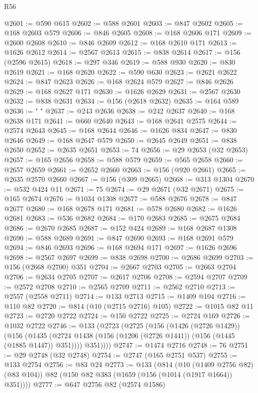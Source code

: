 \begin{lexlean}{R56}
\begin{coremodule}
@2601 := @590 @615
@2602 := @588 @2601
@2603 := @847 @2602
@2605 := @168 @2603 @579
@2606 := @846 @2605
@2608 := @168 @2606 @171
@2609 := @2600 @2608
@2610 := @846 @2609
@2612 := @168 @2610 @171
@2613 := @1626 @2612
@2614 := @2567 @2613
@2615 := @838 @2614
@2617 := @156 (@2596 @2615)
@2618 := @297 @346
@2619 := @588 @930
@2620 := @830 @2619
@2621 := @168 @2620
@2622 := @590 @630
@2623 := @2621 @2622
@2624 := @847 @2623
@2626 := @168 @2624 @579
@2627 := @846 @2626
@2629 := @168 @2627 @171
@2630 := @1626 @2629
@2631 := @2567 @2630
@2632 := @838 @2631
@2634 := @156 (@2618 @2632)
@2635 := @164 @589
@2636 := " "
@2637 := @243 @2636
@2638 := @242 @2637
@2640 := @168 @2638 @171
@2641 := @660 @2640
@2643 := @168 @2641 @2575
@2644 := @2574 @2643
@2645 := @168 @2644
@2646 := @1626 @834
@2647 := @830 @2646
@2649 := @168 @2647 @579
@2650 := @2645 @2649
@2651 := @838 @2650
@2652 := @2635 @2651
@2653 := 74
@2656 := @29 @2653 (@32 @2653)
@2657 := @165 @2656
@2658 := @588 @579
@2659 := @565 @2658
@2660 := @2657 @2659
@2661 := @2652 @2660
@2663 := @156 (@920 @2661)
@2665 := @2635 @2570 @2660
@2667 := @156 (@309 @2665)
@2668 := @313 @1304
@2670 := @532 @424 @11
@2671 := 75
@2674 := @29 @2671 (@32 @2671)
@2675 := @165 @2674
@2676 := @1034 @1308
@2677 := @588 @2676
@2678 := @847 @2677
@2680 := @168 @2678 @171
@2681 := @578 @2680
@2682 := @1626 @2681
@2683 := @536 @2682
@2684 := @170 @2683
@2685 := @2675 @2684
@2686 := @2670 @2685
@2687 := @152 @424
@2689 := @168 @2687 @1308
@2690 := @588 @2689
@2691 := @847 @2690
@2693 := @168 @2691 @579
@2694 := @846 @2693
@2696 := @168 @2694 @171
@2697 := @1626 @2696
@2698 := @2567 @2697
@2699 := @838 @2698
@2700 := @2686 @2699
@2703 := @156 (@2668 @2700) @351
@2704 := @2667 @2703
@2705 := @2663 @2704
@2706 := @2634 @2705
@2707 := @2617 @2706
@2708 := @2594 @2707
@2709 := @2572 @2708
@2710 := @2565 @2709
@2711 := @2562 @2710
@2713 := @2557 (@2558 @2711)
@2714 := @133 @2713
@2715 := @1409 @104
@2716 := @110 @82
@2720 := @814 (@10 (@2715 @2716) @105)
@2722 := @1015 @82 @11
@2723 := @2720 @2722
@2724 := @150 @2722
@2725 := @2724 @169
@2726 := @1032 @2722
@2746 := @133
    (@2723
      (@2725
        (@156
          (@1426 (@2726 @1429))
          (@156
            (@1435 (@2724 @1438 (@156 (@1206 (@2726 @1441)) (@156 (@1445 (@1885 @1447)) @351))))
            @351))))
@2747 := @1474 @2716
@2748 := 76
@2751 := @29 @2748 (@32 @2748)
@2754 := @2747 (@165 @2751 @537)
@2755 := @133 @2754
@2756 := @83 @24
@2773 := @133
    (@814
      (@10 (@1409 @2756 @82) (@83 @104))
      @82
      (@150 @82 @383 (@1659 (@156 (@1014 (@1917 @1664)) @351))))
@2777 := @647 @2756 @82 (@2574 @1586)

\end{coremodule}
\end{lexlean}
